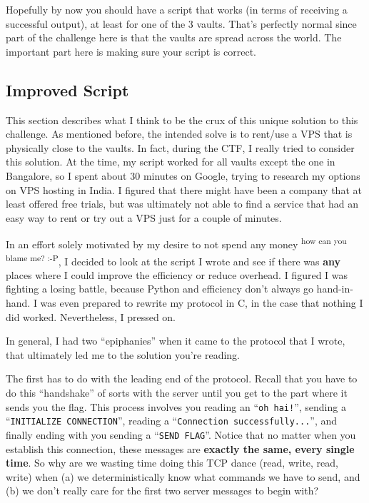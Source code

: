 \documentclass[11pt]{article}
\newcommand{\ts}{\textsuperscript}
\begin{document}
    Hopefully by now you should have a script that works (in terms of receiving a successful output), at least for one of the 3 vaults. That's perfectly normal since part of the challenge here is that the vaults are spread across the world. The important part here is making sure your script is correct.

    \subsection{Improved Script}\label{subsec:improved-script}

    This section describes what I think to be the crux of this unique solution to this challenge. As mentioned before, the intended solve is to rent/use a VPS that is physically close to the vaults. In fact, during the CTF, I really tried to consider this solution. At the time, my script worked for all vaults except the one in Bangalore, so I spent about 30 minutes on Google, trying to research my options on VPS hosting in India. I figured that there might have been a company that at least offered free trials, but was ultimately not able to find a service that had an easy way to rent or try out a VPS just for a couple of minutes.

    \bigskip

    In an effort solely motivated by my desire to not spend any money \ts{how can you blame me? :-P}, I decided to look at the script I wrote and see if there was \textbf{any} places where I could improve the efficiency or reduce overhead. I figured I was fighting a losing battle, because Python and efficiency don't always go hand-in-hand. I was even prepared to rewrite my protocol in C, in the case that nothing I did worked. Nevertheless, I pressed on.

    \bigskip

    In general, I had two ``epiphanies'' when it came to the protocol that I wrote, that ultimately led me to the solution you're reading.

    The first has to do with the leading end of the protocol. Recall that you have to do this ``handshake'' of sorts with the server until you get to the part where it sends you the flag. This process involves you reading an ``\verb`oh hai!`'', sending a ``\verb`INITIALIZE CONNECTION`'', reading a ``\verb`Connection successfully...`'', and finally ending with you sending a ``\verb`SEND FLAG`''. Notice that no matter when you establish this connection, these messages are \textbf{exactly the same, every single time}. So why are we wasting time doing this TCP dance (read, write, read, write) when (a) we deterministically know what commands we have to send, and (b) we don't really care for the first two server messages to begin with?
\end{document}
